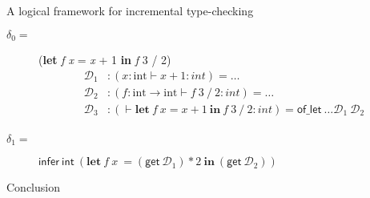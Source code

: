 \documentclass{beamer}
\theoremstyle{example}
\begin{document}
\begin{frame}{A logical framework for incremental type-checking}
  \begin{examples}

    \begin{description}
    \item[$\delta_0 = $]
        (\textbf{let} \textit{f x} = \textit{x} + 1
      \textbf{in} \textit{f} 3 / 2)
      \pause
      {\footnotesize
        \begin{align*}
          \mathcal D_1 &: (x:\mathrm{int}\vdash x+1 : int) = \ldots \\
          \mathcal D_2 &: (f:\mathrm{int}\to\mathrm{int}\vdash f\ 3\ /\ 2
          : int) = \ldots \\
          \mathcal D_3 &: (\vdash \mathbf{let}\ \mathit{f\ x} = \mathit{x}
          + 1\ \mathbf{in}\ \mathit{f}\ 3\ /\ 2 : int) =
          \mathsf{of\_let}\ \ldots \mathcal D_1\ \mathcal D_2 \\
        \end{align*}}
      \pause
  \item[$\delta_1 = $]
    $
    \mathsf{infer}\ \mathsf{int}\ (\mathbf{let}\ f\ x\ = (\mathsf{get}\ \mathcal D_1) * 2\
    \mathbf{in}\ (\mathsf{get}\ \mathcal D_2))
    $
    \end{description}
  \end{examples}
\end{frame}

\begin{frame}{Conclusion}
  
\end{frame}
\end{document}
